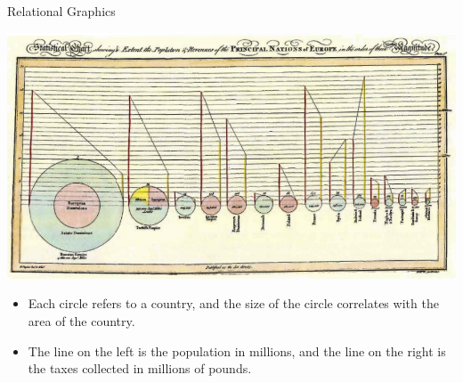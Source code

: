 \documentclass[
  ignorenonframetext,
]{beamer}
\begin{document}
\begin{frame}{Relational Graphics}
\label{relational-graphics-1}
\begin{minipage}{1\textwidth}
\centering
\includegraphics[width=\textwidth]{excellence_figs/fig_24.png}
\end{minipage}
\hfill \vspace{3mm}
\begin{minipage}{1\textwidth}
\footnotesize
\begin{itemize}
  \item Each circle refers to a country, and the size of the circle correlates with the area of the country.
  \item The line on the left is the population in millions, and the line on the right is the taxes collected in millions of pounds.
\end{itemize}
\end{minipage}
\end{frame}
\end{document}
